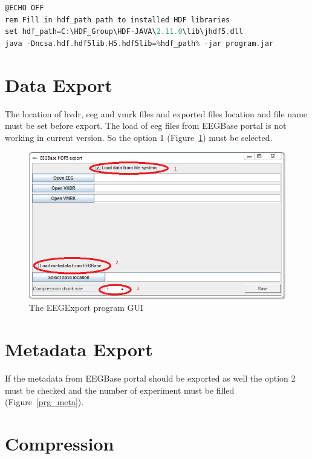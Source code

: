 \documentclass{diplomka}
\begin{document}
\begin{lstlisting}[language=C,frame=single,caption={Bat file},label=batfile]
@ECHO OFF
rem Fill in hdf_path path to installed HDF libraries
set hdf_path=C:\HDF_Group\HDF-JAVA\2.11.0\lib\jhdf5.dll
java -Dncsa.hdf.hdf5lib.H5.hdf5lib=%hdf_path% -jar program.jar
\end{lstlisting}

\section{Data Export}

The location of hvdr, eeg and vmrk files and exported files location and file name must be set before export. The load of eeg files from EEGBase portal is not working in current version. So the option 1 (Figure~\ref{prg_gui}) must be selected. 

\begin{figure}[h]
	\begin{center}		
		\includegraphics[scale=0.75]{obrazky/appendix/gui-start.png}
		\caption{The EEGExport program GUI}
		\label{prg_gui}
	\end{center}
\end{figure}
\newpage
\section{Metadata Export}

If the metadata from EEGBase portal should be exported as well the option 2 must be checked and the number of experiment must be filled (Figure~\ref{prg_meta}).

\section{Compression}
\end{document}
